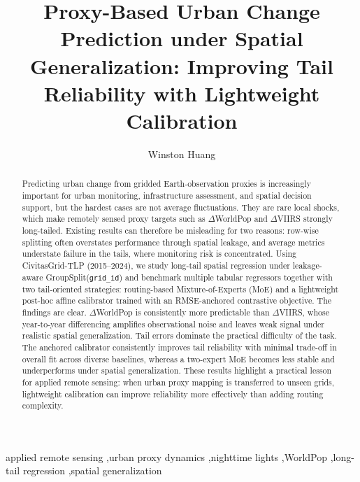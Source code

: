 \documentclass[preprint,12pt]{elsarticle}
\begin{document}
\begin{frontmatter}

\title{Proxy-Based Urban Change Prediction under Spatial Generalization: Improving Tail Reliability with Lightweight Calibration}

\author[1]{Winston Huang}



\begin{abstract}
Predicting urban change from gridded Earth-observation proxies is increasingly important for urban monitoring, infrastructure assessment, and spatial decision support, but the hardest cases are not average fluctuations. They are rare local shocks, which make remotely sensed proxy targets such as $\Delta$WorldPop and $\Delta$VIIRS strongly long-tailed. Existing results can therefore be misleading for two reasons: row-wise splitting often overstates performance through spatial leakage, and average metrics understate failure in the tails, where monitoring risk is concentrated. Using CivitasGrid-TLP (2015--2024), we study long-tail spatial regression under leakage-aware GroupSplit(\texttt{grid\_id}) and benchmark multiple tabular regressors together with two tail-oriented strategies: routing-based Mixture-of-Experts (MoE) and a lightweight post-hoc affine calibrator trained with an RMSE-anchored contrastive objective. The findings are clear. $\Delta$WorldPop is consistently more predictable than $\Delta$VIIRS, whose year-to-year differencing amplifies observational noise and leaves weak signal under realistic spatial generalization. Tail errors dominate the practical difficulty of the task. The anchored calibrator consistently improves tail reliability with minimal trade-off in overall fit across diverse baselines, whereas a two-expert MoE becomes less stable and underperforms under spatial generalization. These results highlight a practical lesson for applied remote sensing: when urban proxy mapping is transferred to unseen grids, lightweight calibration can improve reliability more effectively than adding routing complexity.
\end{abstract}

\begin{keyword}
applied remote sensing \sep urban proxy dynamics \sep nighttime lights \sep WorldPop \sep long-tail regression \sep spatial generalization
\end{keyword}

\end{frontmatter}
\end{document}

